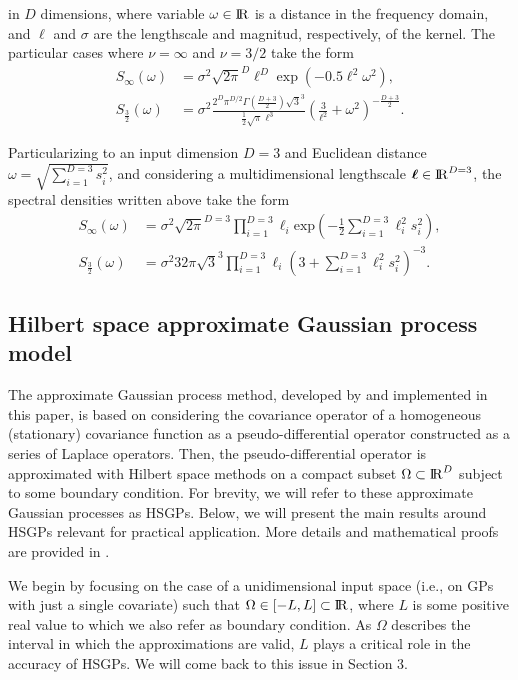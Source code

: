 \documentclass[]{interact}
\theoremstyle{plain}%
\theoremstyle{definition}
\theoremstyle{remark}
\begin{document}
\noindent in $D$ dimensions, where variable $\omega\in {\rm I\!R}$ is a distance in the frequency domain, and $\ell$ and $\sigma$ are the lengthscale and magnitud, respectively, of the kernel. The particular cases where $\nu=\infty$ and $\nu=3/2$ take the form
%
\begin{align}
S_{\infty}(\omega)&= \sigma^2 \sqrt{2\pi}^D  \ell^D  \exp\left(-0.5 \ell^2 \omega^2\right), \label{eq:specdens_inf}  \\
S_{\frac{3}{2}}(\omega)&= \sigma^2 \frac{2^D\pi^{D/2}\Gamma(\frac{D+3}{2})\sqrt{3}^3}{\frac{1}{2}\sqrt{\pi}\ell^3}\left(\frac{3}{\ell^2}+\omega^2 \right)^{-\frac{D+3}{2}}. \label{eq:specdens_32} 
\end{align}

\noindent Particularizing to an input dimension $D=3$ and Euclidean distance $\omega=\sqrt{\sum_{i=1}^{D=3}s_i^2}$, and considering a multidimensional lengthscale $\bm{\ell} \in {\rm I\!R}^{D=3}$, the spectral densities written above take the form
%
\begin{align*}
S_{\infty}(\omega)&= \sigma^2 \sqrt{2\pi}^{D=3}  \prod_{i=1}^{D=3} \ell_i  \mathrm{exp}\left(-\frac{1}{2} \sum_{i=1}^{D=3} \ell_i^2 s_i^2 \right),   \\
S_{\frac{3}{2}}(\omega)&= \sigma^2 32\pi\sqrt{3}^3\prod_{i=1}^{D=3}\ell_i\left(3+\sum_{i=1}^{D=3}\ell_i^2 s_i^2 \right)^{-3}.
\end{align*}


\subsection{Hilbert space approximate Gaussian process model}

The approximate Gaussian process method, developed by \cite{solin2018hilbert} and implemented in this paper, is based on considering the covariance operator of a homogeneous (stationary) covariance function as a pseudo-differential operator constructed as a series of Laplace operators. Then, the pseudo-differential operator is approximated with Hilbert space methods on a compact subset $\Omega \subset {\rm I\!R}^D$ subject to some boundary condition. For brevity, we will refer to these approximate Gaussian processes as HSGPs. Below, we will present the main results around HSGPs relevant for practical application. More details and mathematical proofs are provided in \cite{solin2018hilbert}.

We begin by focusing on the case of a unidimensional input space (i.e., on GPs with just a single covariate) such that $\Omega \in [-L,L] \subset {\rm I\!R}$, where $L$ is some positive real value to which we also refer as boundary condition. As $\Omega$ describes the interval in which the approximations are valid, $L$ plays a critical role in the accuracy of HSGPs. We will come back to this issue in Section 3.
\end{document}
